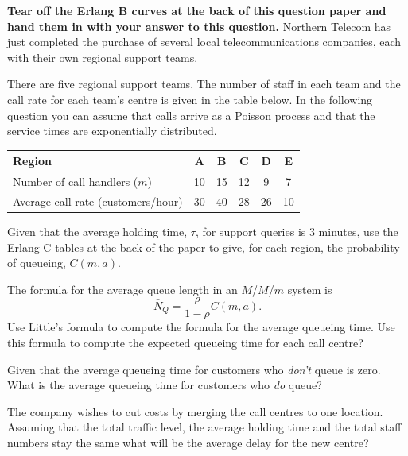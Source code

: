 \documentclass[12pt,fleqn]{article}
\begin{document}
\begin{exam}
\turnover
\begin{question}
\bigskip
{\bf Tear off the Erlang B curves at the back of this question paper and hand them in with your answer to this question.} Northern Telecom has just completed the purchase of several local telecommunications companies, each with their own regional support teams. 
%
\begin{qupart}
There are five regional support teams. The number of staff in each team and the call rate for each team's centre is given in the table below. In the following question you can assume that calls arrive as a Poisson process and that the service times are exponentially distributed. 
\vspace{1cm}
\begin{center}
\begin{tabular}{l|c|c|c|c|c}
Region & A & B & C & D & E \\
\hline
Number of call handlers ($m$) & 10 & 15 & 12 & 9 & 7 \\
Average call rate (customers/hour) & 30 & 40 & 28 & 26 & 10  
\end{tabular}
\end{center}
\vspace{1cm}
Given that the average holding time, $\tau$, for support queries is 3 minutes, use the Erlang C tables at the back of the paper to give, for each region, the probability of queueing, $C(m, a)$.  
\end{qupart}
%
\begin{qupart}
The formula for the average queue length in an $M$/$M$/$m$ system is 
\begin{equation}
\bar{N}_Q = \frac{\rho}{1-\rho}C(m,a).
\end{equation}
Use Little's formula to compute the formula for the average queueing time.
Use this formula to compute the expected queueing time for each call centre?
\end{qupart}
%
\begin{qupart}
Given that the average queueing time for customers who \emph{don't} queue is zero. What is the average queueing time for customers who \emph{do} queue?
\end{qupart}

\begin{qupart}
The company wishes to cut costs by merging the call centres to one location. Assuming that the total traffic level, the average holding time and the total staff numbers stay the same what will be the average delay for the new centre?  
\end{qupart}


\end{question}
\end{exam}
\end{document}
